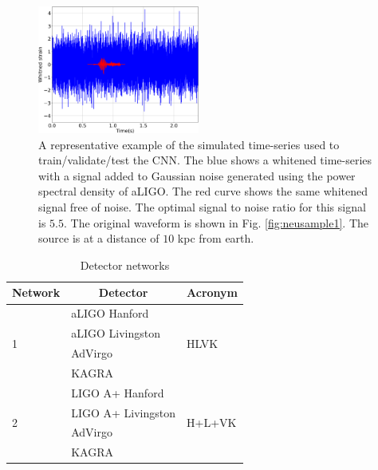 \documentclass[aps,twocolumn,showpacs,groupedaddress, nofootinbib]{revtex4}  %
\begin{document}
%
%
\begin{figure}
\includegraphics[width=0.475\textwidth]{datasample.png}
\caption{A representative example of the simulated time-series used to
train/validate/test the \ac{CNN}. The blue shows a whitened time-series with a
signal added to Gaussian noise generated using the power spectral density of \ac{aLIGO}. 
The red curve shows the same whitened signal free of
noise. The optimal signal to noise ratio for this signal is $5.5$.
The original waveform is shown in Fig. \ref{fig:neusample1}.
The source is at a distance of $10$ kpc from earth.
\label{fig:sample}} 
\end{figure}

\begin{table}[]
\centering
\begin{threeparttable}
\caption{Detector networks}
\label{table:network}
\begin{tabular}{lll}
\toprule
Network            & \multicolumn{1}{c}{Detector}                & Acronym                 \\
\hline
\multirow{4}{*}{1} & \ac{aLIGO} Hanford~\cite{aasi2015advanced}    & \multirow{4}{*}{HLVK}   \\
                   & \ac{aLIGO} Livingston &                         \\
                   & \ac{AdVirgo}~\cite{acernese2014advanced}           &                         \\
                   & KAGRA~\cite{aso2013interferometer}                    &                         \\
                   \hline
\multirow{4}{*}{2} & LIGO A+ Hanford~\cite{miller2015prospects, LIGOW}          & \multirow{4}{*}{H+L+VK} \\
                   & LIGO A+ Livingston       &                         \\
                   & \ac{AdVirgo}           &                         \\
                   & KAGRA                    &                         \\
\hline
\hline
\end{tabular}
\begin{tablenotes}
\setlength{}
\end{tablenotes}
\end{threeparttable}
\end{table}
\end{document}
